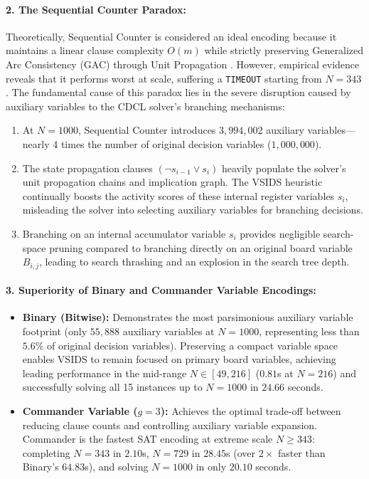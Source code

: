 \documentclass[a4paper,fleqn]{cas-sc}
\begin{document}
\paragraph{2. The Sequential Counter Paradox:}
Theoretically, Sequential Counter is considered an ideal encoding because it maintains a linear clause complexity $O(m)$ while strictly preserving Generalized Arc Consistency (GAC) through Unit Propagation \cite{sinz2005towards}. However, empirical evidence reveals that it performs worst at scale, suffering a \texttt{TIMEOUT} starting from $N = 343$. The fundamental cause of this paradox lies in the severe disruption caused by auxiliary variables to the CDCL solver's branching mechanisms:
\begin{enumerate}
    \item At $N = 1000$, Sequential Counter introduces $3,994,002$ auxiliary variables---nearly 4 times the number of original decision variables ($1,000,000$).
    \item The state propagation clauses $(\neg s_{i-1} \lor s_i)$ heavily populate the solver's unit propagation chains and implication graph. The VSIDS heuristic continually boosts the activity scores of these internal register variables $s_i$, misleading the solver into selecting auxiliary variables for branching decisions.
    \item Branching on an internal accumulator variable $s_i$ provides negligible search-space pruning compared to branching directly on an original board variable $B_{i,j}$, leading to search thrashing and an explosion in the search tree depth.
\end{enumerate}

\paragraph{3. Superiority of Binary and Commander Variable Encodings:}
\begin{itemize}
    \item \textbf{Binary (Bitwise):} Demonstrates the most parsimonious auxiliary variable footprint (only $55,888$ auxiliary variables at $N = 1000$, representing less than $5.6\%$ of original decision variables). Preserving a compact variable space enables VSIDS to remain focused on primary board variables, achieving leading performance in the mid-range $N \in [49, 216]$ ($0.81$s at $N=216$) and successfully solving all 15 instances up to $N = 1000$ in $24.66$ seconds.
    \item \textbf{Commander Variable ($g=3$):} Achieves the optimal trade-off between reducing clause counts and controlling auxiliary variable expansion. Commander is the fastest SAT encoding at extreme scale $N \ge 343$: completing $N = 343$ in $2.10$s, $N = 729$ in $28.45$s (over $2\times$ faster than Binary's $64.83$s), and solving $N = 1000$ in only $20.10$ seconds.
\end{itemize}
\end{document}

